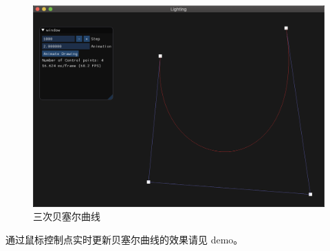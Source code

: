 \documentclass[12pt]{article}
\begin{document}
\begin{enumerate}
    \begin{figure}[H]
        \centering
        \includegraphics[scale=0.5]{cubic.png}
        \caption{三次贝塞尔曲线}
        \label{}
    \end{figure}

    通过鼠标控制点实时更新贝塞尔曲线的效果请见 demo。
\end{enumerate}
\end{document}
